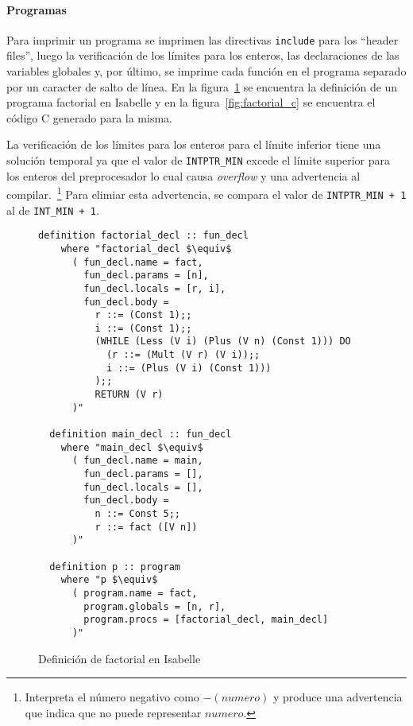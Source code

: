 \paragraph*{Programas}

Para imprimir un programa se imprimen las directivas \verb|include| para los ``header files'', luego la verificación de los límites para los enteros, las declaraciones de las variables globales y, por último, se imprime cada función en el programa separado por un caracter de salto de línea.
En la figura~\ref{fig:factorial_isabelle} se encuentra la definición de un programa factorial en Isabelle y en la figura~\ref{fig:factorial_c} se encuentra el código C generado para la misma.

La verificación de los límites para los enteros para el límite inferior tiene una solución temporal ya que el valor de \verb|INTPTR_MIN| excede el límite superior para los enteros del preprocesador lo cual causa \textit{overflow} y una advertencia al compilar.~\footnote{Interpreta el número negativo como $-(numero)$ y produce una advertencia que indica que no puede representar $numero$.}
Para elimiar esta advertencia, se compara el valor de \verb|INTPTR_MIN + 1| al de \verb|INT_MIN + 1|.


\begin{figure}
\begin{lstlisting}[mathescape=true]
  definition factorial_decl :: fun_decl
    where "factorial_decl $\equiv$
      ( fun_decl.name = fact,
        fun_decl.params = [n],
        fun_decl.locals = [r, i],
        fun_decl.body =
          r ::= (Const 1);;
          i ::= (Const 1);;
          (WHILE (Less (V i) (Plus (V n) (Const 1))) DO
            (r ::= (Mult (V r) (V i));;
            i ::= (Plus (V i) (Const 1)))
          );;
          RETURN (V r)
      )"

  definition main_decl :: fun_decl
    where "main_decl $\equiv$
      ( fun_decl.name = main,
        fun_decl.params = [],
        fun_decl.locals = [],
        fun_decl.body =
          n ::= Const 5;;
          r ::= fact ([V n])
      )"

  definition p :: program
    where "p $\equiv$
      ( program.name = fact,
        program.globals = [n, r],
        program.procs = [factorial_decl, main_decl]
      )"
\end{lstlisting}
\caption{Definición de factorial en Isabelle}
\label{fig:factorial_isabelle}
\end{figure}


